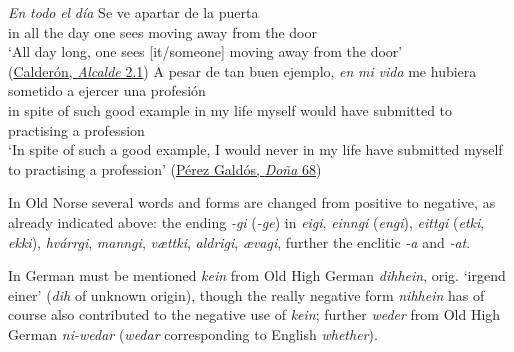 \ea \label{ex:03-20}
\ea
\gll \textit{En} \textit{todo} \textit{el} \textit{día} Se ve apartar de la puerta\\
 in all the day one sees {moving away} from the door\\
\glt `All day long, one sees [it/someone] moving away from the door'\\
\hfill(\href{https://archive.org/details/AGuichot05012/page/48/mode/2up?q=%22en+todo+el+dia%22&view=theater}
{Calderón, \textit{Alcalde} 2.1})
\ex
\gll A pesar de tan buen ejemplo, \textit{en} \textit{mi} \textit{vida} me hubiera sometido a ejercer una profesión\\
 in spite of such good example in my life myself {would have} submitted to practising a profession\\
\glt `In spite of such a good example, I would never in my life have submitted myself to practising a profession'
\hfill(\href{https://archive.org/details/Donaperfecta/page/n57/mode/2up?q=%22A+pesar+de+tan+buen+ejemplo%2C+en+mi+vida+me+hubiera%22&view=theater}
{Pérez Galdós, \textit{Doña} 68}) %
\z
\z

In Old Norse several words and forms are changed from positive to negative, as already indicated above: the ending \textit{-gi} (\textit{-ge}) in \textit{eigi}, \textit{einngi} (\textit{engi}), \textit{eittgi} (\textit{etki}, \textit{ekki}), \textit{hvárrgi}, \textit{manngi}, \textit{vættki}, \textit{aldrigi}, \textit{ævagi}, further the enclitic \textit{-a} and \textit{-at}.

In German must be mentioned \textit{kein} from Old High German \textit{dihhein}, orig. `irgend einer' (\textit{dih} of unknown origin), though the really negative form \textit{nihhein} has of course also contributed to the negative use of \textit{kein}; further \textit{weder} from Old High German \textit{ni-wedar} (\textit{wedar} corresponding to English \textit{whether}).

